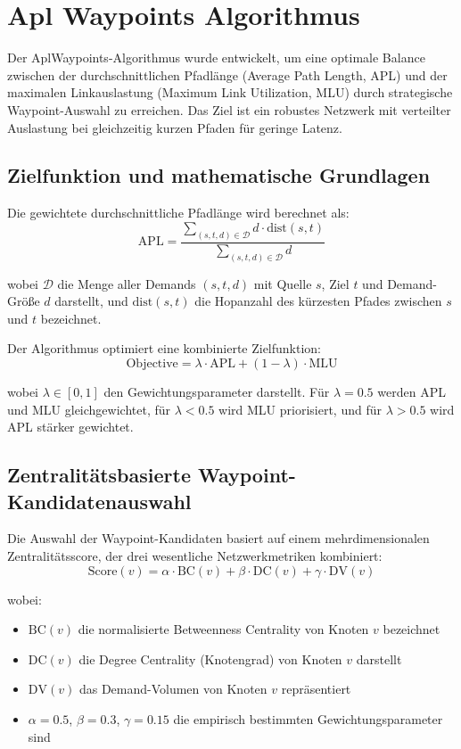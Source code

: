 \chapter{Apl Waypoints Algorithmus}
\label{chapter:algorithmus3}
\graphicspath{{../bilder/}}

Der AplWaypoints-Algorithmus wurde entwickelt, um eine optimale Balance zwischen der durchschnittlichen Pfadlänge (Average Path Length, APL) und der maximalen Linkauslastung (Maximum Link Utilization, MLU) durch strategische Waypoint-Auswahl zu erreichen. Das Ziel ist ein robustes Netzwerk mit verteilter Auslastung bei gleichzeitig kurzen Pfaden für geringe Latenz.

\section{Zielfunktion und mathematische Grundlagen}

Die gewichtete durchschnittliche Pfadlänge wird berechnet als:
\[
\text{APL} = \frac{\sum_{(s,t,d) \in \mathcal{D}} d \cdot \text{dist}(s,t)}{\sum_{(s,t,d) \in \mathcal{D}} d}
\]

wobei $\mathcal{D}$ die Menge aller Demands $(s,t,d)$ mit Quelle $s$, Ziel $t$ und Demand-Größe $d$ darstellt, und $\text{dist}(s,t)$ die Hopanzahl des kürzesten Pfades zwischen $s$ und $t$ bezeichnet.

Der Algorithmus optimiert eine kombinierte Zielfunktion:
\[
\text{Objective} = \lambda \cdot \text{APL} + (1-\lambda) \cdot \text{MLU}
\]

wobei $\lambda \in [0,1]$ den Gewichtungsparameter darstellt. Für $\lambda = 0.5$ werden APL und MLU gleichgewichtet, für $\lambda < 0.5$ wird MLU priorisiert, und für $\lambda > 0.5$ wird APL stärker gewichtet.

\section{Zentralitätsbasierte Waypoint-Kandidatenauswahl}

Die Auswahl der Waypoint-Kandidaten basiert auf einem mehrdimensionalen Zentralitätsscore, der drei wesentliche Netzwerkmetriken kombiniert:
\[
\text{Score}(v) = \alpha \cdot \text{BC}(v) + \beta \cdot \text{DC}(v) + \gamma \cdot \text{DV}(v)
\]

wobei:
\begin{itemize}
    \item $\text{BC}(v)$ die normalisierte Betweenness Centrality von Knoten $v$ bezeichnet
    \item $\text{DC}(v)$ die Degree Centrality (Knotengrad) von Knoten $v$ darstellt
    \item $\text{DV}(v)$ das Demand-Volumen von Knoten $v$ repräsentiert
    \item $\alpha = 0.5$, $\beta = 0.3$, $\gamma = 0.15$ die empirisch bestimmten Gewichtungsparameter sind
\end{itemize}


